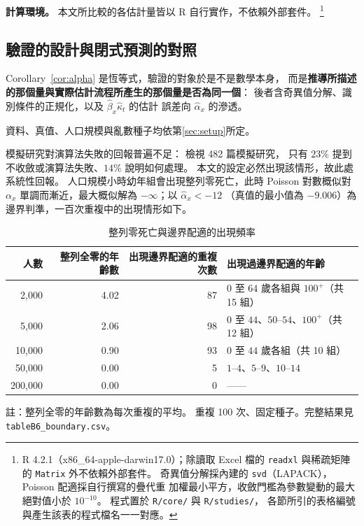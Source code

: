 \documentclass[UTF8, fontset=macnew, a4paper, 12pt]{ctexart}
\begin{document}
\textbf{計算環境。} 本文所比較的各估計量皆以 R 自行實作，不依賴外部套件。%
\footnote{R 4.2.1（x86\_64-apple-darwin17.0）；除讀取 Excel 檔的
\texttt{readxl} 與稀疏矩陣的 \texttt{Matrix} 外不依賴外部套件。
奇異值分解採內建的 \texttt{svd}（LAPACK），Poisson 配適採自行撰寫的疊代重
加權最小平方，收斂門檻為參數變動的最大絕對值小於 $10^{-10}$。
程式置於 \texttt{R/core/} 與 \texttt{R/studies/}，
各節所引的表格編號與產生該表的程式檔名一一對應。}


\subsection{驗證的設計與閉式預測的對照}\label{subsec:vdesign}\label{sec:closedfit}

Corollary~\ref{cor:alpha} 是恆等式，驗證的對象於是不是數學本身，
而是\textbf{推導所描述的那個量與實際估計流程所產生的那個量是否為同一個}：
後者含奇異值分解、識別條件的正規化，以及 $\hat\beta_x\hat\kappa_t$ 的估計
誤差向 $\hat\alpha_x$ 的滲透。

資料、真值、人口規模與亂數種子均依第\ref{sec:setup}所定。

模擬研究對演算法失敗的回報普遍不足：\citet{pawel2026} 檢視 482 篇模擬研究，
只有 $23\%$ 提到不收斂或演算法失敗、$14\%$ 說明如何處理。
本文的設定必然出現該情形，故此處系統性回報。
人口規模小時幼年組會出現整列零死亡，此時 Poisson 對數概似對 $\alpha_x$
單調而漸近，最大概似解為 $-\infty$；以 $\hat\alpha_x<-12$
（真值的最小值為 $-9.006$）為邊界判準，一百次重複中的出現情形如下。

\begin{table}[H]
\centering
\caption{整列零死亡與邊界配適的出現頻率}
\small
\renewcommand{\arraystretch}{1.1}
\begin{tabular}{rrrl}
\toprule
人數 & 整列全零的年齡數 & 出現邊界配適的重複次數 & 出現過邊界配適的年齡\\
\midrule
2{,}000 & 4.02 & 87 & $0$ 至 $64$ 歲各組與 $100^{+}$（共 15 組）\\
5{,}000 & 2.06 & 98 & $0$ 至 $44$、$50$--$54$、$100^{+}$（共 12 組）\\
10{,}000 & 0.90 & 93 & $0$ 至 $44$ 歲各組（共 10 組）\\
50{,}000 & 0.00 & 5 & $1$--$4$、$5$--$9$、$10$--$14$\\
200{,}000 & 0.00 & 0 & ——\\
\bottomrule
\end{tabular}

\vspace{2pt}
\parbox{0.92\textwidth}{\footnotesize 註：整列全零的年齡數為每次重複的平均。
重複 100 次、固定種子。完整結果見 \texttt{tableB6\_boundary.csv}。}
\label{tab:boundary}
\end{table}
\end{document}

